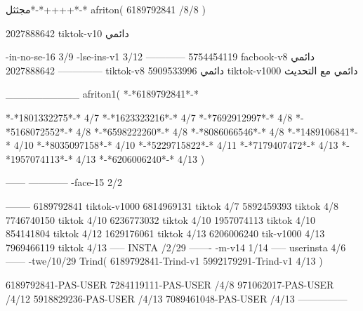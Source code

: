 مجثثل*-*++++*-*
afriton(
6189792841 /8/8
)

2027888642 tiktok-v10
دائمي

-in-no-se-16 3/9
-lse-ins-v1 3/12
------------
5754454119 facbook-v8
دائمي
--------------
2027888642 tiktok-v8
دائمي
5909533996 tiktok-v1000
دائمي مع التحديث

__________
afriton1(
*-*6189792841*-*

*-*1801332275*-* 4/7
*-*1623323216*-* 4/7
*-*7692912997*-* 4/8
*-*5168072552*-* 4/8
*-*6598222260*-* 4/8
*-*8086066546*-* 4/8
*-*1489106841*-* 4/10
*-*8035097158*-* 4/10
*-*5229715822*-* 4/11
*-*7179407472*-* 4/13
*-*1957074113*-* 4/13
*-*6206006240*-* 4/13
)


------
------------
-face-15 2/2

--------
6189792841 tiktok-v1000
6814969131 tiktok 4/7
5892459393 tiktok 4/8
7746740150 tiktok 4/10
6236773032 tiktok 4/10
1957074113 tiktok 4/10
854141804 tiktok 4/12
1629176061 tiktok 4/13
6206006240 tik-v1000 4/13
7969466119 tiktok 4/13
-----
 INSTA /2/29
-------
-m-v14 1/14
-----
userinsta 4/6
------
-twe/10/29
Trind(
6189792841-Trind-v1 
5992179291-Trind-v1  4/13
)

6189792841-PAS-USER
7284119111-PAS-USER /4/8
971062017-PAS-USER /4/12
5918829236-PAS-USER /4/13
7089461048-PAS-USER /4/13
    ---------------
